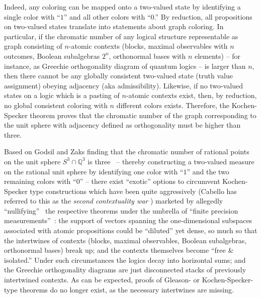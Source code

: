 \documentclass[%
  twocolumn,
 showpacs,
 showkeys,
 preprintnumbers,
 amsmath,amssymb,
 aps,
  pra,
  longbibliography,
 floatfix,
 ]{revtex4-1}
\begin{document}
Indeed, any coloring can be mapped onto a two-valued state by identifying
a single color with ``$1$'' and all other colors with ``$0$.''
By reduction, all propositions on two-valued states translate into statements about graph coloring.
In particular, if the chromatic number of any logical structure representable as graph consisting of $n$-atomic
contexts
(blocks, maximal observables with $n$ outcomes, Boolean subalgebras $2^n$, orthonormal bases with $n$ elements)
--
for instance, as Greechie orthogonality diagram of quantum logics
--
is larger than $n$,
then there cannot be any globally consistent two-valued state (truth value assignment) obeying adjacency (aka admissibility).
Likewise, if no two-valued states  on a logic
which is a pasting of $n$-atomic contexts
exist, then, by reduction, no global consistent coloring with $n$ different colors exists.
Therefore, the Kochen-Specker theorem proves that the chromatic number of the graph corresponding to
the unit sphere with adjacency defined as orthogonality must be higher than three.





Based on Godsil and Zaks finding that the chromatic number of rational points on the  unit sphere
$S^3\cap \mathbb{Q}^3$
is three~\cite[Lemma~1.2]{godsil-zaks} -- thereby constructing a two-valued measure on the rational unit sphere
by identifying one color with ``$1$'' and the two remaining colors with ``$0$'' --
there exist ``exotic'' options to circumvent Kochen-Specker type constructions which have been quite aggressively (Cabello has referred to this
as the {\em second contextuality war} \cite{Cabello-talk-Vajo-2017})
marketed by allegedly ``nullifying''~\cite{meyer:99} the respective theorems
under the umbrella of ``finite precision measurements''~\cite{kent:99,clifton:99,mermin-99iks,Breuer-02a,Breuer-02b,Barrett-2004}:
the support of vectors spanning the one-dimensional subspaces associated with atomic propositions could be ``diluted'' yet dense,
so much so that the intertwines of contexts (blocks, maximal observables, Boolean subalgebras, orthonormal bases) break up;
and the contexts themselves become ``free \& isolated.''
Under such circumstances the logics decay into horizontal sums;
and the Greechie orthogonality diagrams are just disconnected stacks of previously intertwined contexts.
As can be expected, proofs of Gleason- or Kochen-Specker-type theorems do no longer exist,
as the necessary intertwines are missing.
\end{document}
